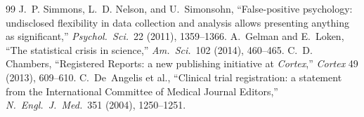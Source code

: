 \begin{thebibliography}{99}
 J.~P. Simmons, L.~D. Nelson, and U.~Simonsohn, ``False-positive psychology: undisclosed flexibility in data collection and analysis allows presenting anything as significant,'' \emph{Psychol.\ Sci.}\ 22 (2011), 1359--1366.
 A.~Gelman and E.~Loken, ``The statistical crisis in science,'' \emph{Am.\ Sci.}\ 102 (2014), 460--465.
 C.~D. Chambers, ``Registered Reports: a new publishing initiative at \emph{Cortex},'' \emph{Cortex} 49 (2013), 609--610.
 C.~De~Angelis et al., ``Clinical trial registration: a statement from the International Committee of Medical Journal Editors,'' \emph{N.\ Engl.\ J.\ Med.}\ 351 (2004), 1250--1251.
\end{thebibliography}
